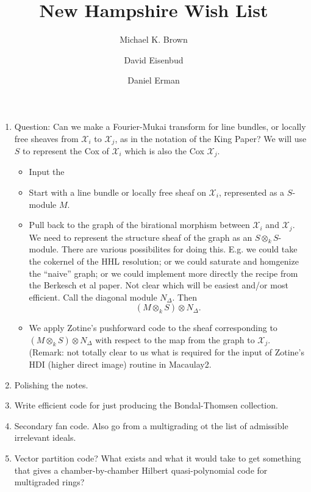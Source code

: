 \documentclass[11pt]{amsart}
\title{New Hampshire Wish List}
\author{Michael K. Brown}
\author{David Eisenbud}
\author{Daniel Erman}
\numberwithin{equation}{section}
\theoremstyle{definition}
\theoremstyle{remark}
\def\sX{\mathcal X}
\begin{document}
    \maketitle

\begin{enumerate}
    \item  Question:  Can we make a Fourier-Mukai transform for line bundles, or locally free sheaves from $\sX_i$ to $\sX_j$, as in the notation of the King Paper?  We will use $S$ to represent the Cox of $\sX_i$ which is also the Cox $\sX_j$.
        \begin{itemize}
            \item  Input the
            \item  Start with a line bundle or locally free sheaf on $\sX_i$, represented as a $S$-module $M$.
            \item  Pull back to the graph of the birational morphism between $\sX_i$ and $\sX_j$.  We need to represent the structure sheaf of the graph as an $S \otimes_k S$-module.  There are various possibilites for doing this. E.g. we could take the cokernel of the HHL resolution; or we could saturate and homgenize the ``naive'' graph;  or we could implement more directly the recipe from the Berkesch et al paper.  Not clear which will be easiest and/or most efficient.   Call the diagonal module $N_{\Delta}$.  Then 
            \[
            (M\otimes_k S) \otimes N_{\Delta}.
            \]
            \item  We apply Zotine's pushforward code to the sheaf corresponding to $(M\otimes_k S) \otimes N_{\Delta}$ with respect to the map from the graph to $\sX_j$.  (Remark:  not totally clear to us what is required for the input of Zotine's HDI (higher direct image) routine in Macaulay2.
        \end{itemize}
    \item  Polishing the notes.
    \item  Write efficient code for just producing the Bondal-Thomsen collection.
    \item  Secondary fan code.  Also go from a multigrading ot the list of admissible irrelevant ideals.
    \item  Vector partition code?  What exists and what it would take to get something that gives a chamber-by-chamber Hilbert quasi-polynomial code for multigraded rings?
\end{enumerate}

    
\end{document}
